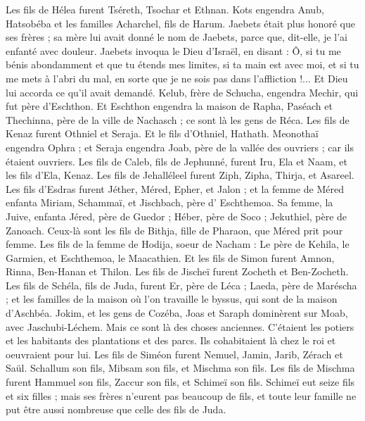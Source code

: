 \begin{multicols}{2}
Les fils de Hélea furent Tséreth, Tsochar et Ethnan.
Kots engendra Anub, Hatsobéba et les familles Acharchel, fils de Harum.
Jaebets était plus honoré que ses frères ; sa mère lui avait donné le nom de Jaebets, parce que, dit-elle, je l'ai enfanté avec douleur.
Jaebets invoqua le Dieu d'Israël, en disant : Ô, si tu me bénis abondamment et que tu étends mes limites, si ta main est avec moi, et si tu me mets à l'abri du mal, en sorte que je ne sois pas dans l’affliction !... Et Dieu lui accorda ce qu'il avait demandé.
Kelub, frère de Schucha, engendra Mechir, qui fut père d'Eschthon.
Et Eschthon engendra la maison de Rapha, Paséach et Thechinna, père de la ville de Nachasch ; ce sont là les gens de Réca.
Les fils de Kenaz furent Othniel et Seraja. Et le fils d’Othniel, Hathath.
Meonothaï engendra Ophra ; et Seraja engendra Joab, père de la vallée des ouvriers ; car ils étaient ouvriers.
Les fils de Caleb, fils de Jephunné, furent Iru, Ela et Naam, et les fils d'Ela, Kenaz.
Les fils de Jehalléleel furent Ziph, Zipha, Thirja, et Asareel.
Les fils d'Esdras furent Jéther, Méred, Epher, et Jalon ; et la femme de Méred enfanta Miriam, Schammaï, et Jischbach, père d' Eschthemoa.
Sa femme, la Juive, enfanta Jéred, père de Guedor ;  Héber, père de Soco ;  Jekuthiel, père de Zanoach. Ceux-là sont les fils de Bithja, fille de Pharaon, que Méred prit pour femme.
Les fils de la femme de Hodija, soeur de Nacham : Le père de Kehila, le Garmien, et Eschthemoa, le Maacathien.
Et les fils de Simon furent Amnon, Rinna, Ben-Hanan et Thilon. Les fils de Jischeï furent Zocheth et Ben-Zocheth.
Les fils de Schéla, fils de Juda, furent Er, père de Léca ; Laeda, père de Maréscha ; et les familles de la maison où l'on travaille le byssus, qui sont de la maison d'Aschbéa.
Jokim, et les gens de Cozéba, Joas et Saraph dominèrent sur Moab, avec Jaschubi-Léchem. Mais ce sont là des choses anciennes.
C’étaient les potiers et les habitants des plantations  et des parcs. Ils cohabitaient là chez le roi et oeuvraient pour lui.
Les fils de Siméon furent Nemuel, Jamin, Jarib, Zérach et Saül.
Schallum son fils, Mibsam son fils, et Mischma son fils.
Les fils de Mischma furent Hammuel son fils, Zaccur son fils, et Schimeï son fils.
Schimeï eut seize fils et six filles ; mais ses frères n'eurent pas beaucoup de fils, et toute leur famille ne put être aussi nombreuse que celle des fils de Juda.

\end{multicols}
